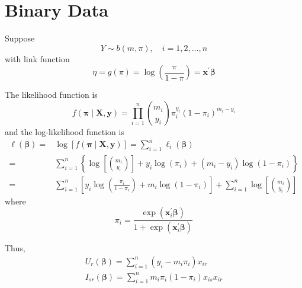 \section{Binary Data}

Suppose
\begin{equation}
    Y\sim b\left(m,\pi\right),\quad i=1,2,\ldots,n
\end{equation}
with link function
\begin{equation}
    \eta=g\left(\pi\right)=\log\left(\frac{\pi}{1-\pi}\right)=\mathbf{x}^{\prime}\boldsymbol{\beta}
\end{equation}
\begin{remark}

\end{remark}

The likelihood function is
\begin{equation}
    f\left(\boldsymbol{\pi}\mid\mathbf{X},\mathbf{y}\right)=\prod_{i=1}^{n}\binom{m_{i}}{y_{i}}\pi_{i}^{y_{i}}\left(1-\pi_{i}\right)^{m_{i}-y_{i}}
\end{equation}
and the log-likelihood function is
\begin{equation}
    \begin{aligned}
        \ell\left(\boldsymbol{\beta}\right)= & \log\left[f\left(\boldsymbol{\pi}\mid\mathbf{X},\mathbf{y}\right)\right]=\sum_{i=1}^{n}\ell_{i}\left(\boldsymbol{\beta}\right)                                 \\
        =                                    & \sum_{i=1}^{n}\left\{\log\left[\binom{m_{i}}{y_{i}}\right]+y_{i}\log\left(\pi_{i}\right)+\left(m_{i}-y_{i}\right)\log\left(1-\pi_{i}\right)\right\}            \\
        =                                    & \sum_{i=1}^{n}\left[y_{i}\log\left(\frac{\pi_{i}}{1-\pi_{i}}\right)+m_{i}\log\left(1-\pi_{i}\right)\right]+\sum_{i=1}^{n}\log\left[\binom{m_{i}}{y_{i}}\right]
    \end{aligned}
\end{equation}
where
\begin{equation}
    \pi_{i}=\frac{\exp\left(\mathbf{x}_{i}^{\prime}\boldsymbol{\beta}\right)}{1+\exp\left(\mathbf{x}_{i}^{\prime}\boldsymbol{\beta}\right)}
\end{equation}

Thus,
\begin{gather*}
    U_{r}\left(\boldsymbol{\beta}\right)=\sum_{i=1}^{n}\left(y_{i}-m_{i}\pi_{i}\right)x_{ir} \\
    I_{sr}\left(\boldsymbol{\beta}\right)=\sum_{i=1}^{n}m_{i}\pi_{i}\left(1-\pi_{i}\right)x_{is}x_{ir}
\end{gather*}

